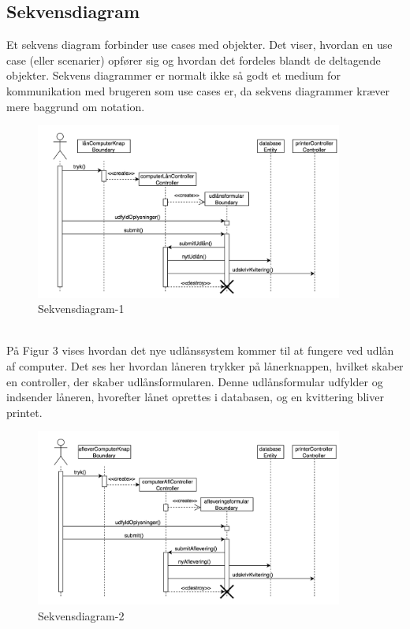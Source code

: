 \documentclass[a4paper]{article}
\begin{document}
\subsection{Sekvensdiagram}
Et sekvens diagram forbinder use cases med objekter. Det viser, hvordan en use case (eller scenarier) opfører sig og hvordan det fordeles blandt de deltagende objekter. Sekvens diagrammer er normalt ikke så godt et medium for kommunikation med brugeren som use cases er, da sekvens diagrammer kræver mere baggrund om notation. \cite[p~179]{OOSE} 
\begin{figure}[h!]
\includegraphics[width=0.9\textwidth]{SekvensLaan}
  \caption{Sekvensdiagram-1}
  \centering
\end{figure}\\
På Figur 3 vises hvordan det nye udlånssystem kommer til at fungere ved udlån af computer. Det ses her hvordan låneren trykker på lånerknappen, hvilket skaber en controller, der skaber udlånsformularen. Denne udlånsformular udfylder og indsender låneren, hvorefter lånet oprettes i databasen, og en kvittering bliver printet.
\newpage
\begin{figure}[h!]
\includegraphics[width=0.9\textwidth]{SekvensAflever}
  \caption{Sekvensdiagram-2}
  \centering
\end{figure}
\end{document}
